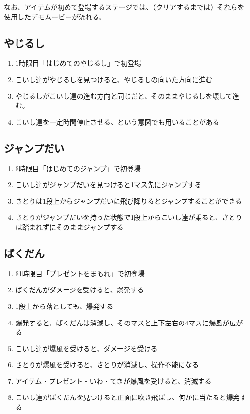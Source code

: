 なお、アイテムが初めて登場するステージでは、（クリアするまでは）それらを使用したデモムービーが流れる。


\subsection{やじるし}
\begin{enumerate}[label={\sarrow}]
\item 1時限目「はじめてのやじるし」で初登場
\item こいし達がやじるしを見つけると、やじるしの向いた方向に進む
\item やじるしがこいし達の進む方向と同じだと、そのままやじるしを壊して進む。
\item こいし達を一定時間停止させる、という意図でも用いることがある
\end{enumerate}


\subsection{ジャンプだい}
\begin{enumerate}[label={\sarrow}]
\item 8時限目「はじめてのジャンプ」で初登場
\item こいし達がジャンプだいを見つけると1マス先にジャンプする
\item さとりは1段上からジャンプだいに飛び降りるとジャンプすることができる
\item さとりがジャンプだいを持った状態で1段上からこいし達が乗ると、さとりは踏まれずにそのままジャンプする
\end{enumerate}


\subsection{ばくだん}
\begin{enumerate}[label={\sarrow}]
\item 81時限目「プレゼントをまもれ」で初登場
\item ばくだんがダメージを受けると、爆発する
\item 1段上から落としても、爆発する
\item 爆発すると、ばくだんは消滅し、そのマスと上下左右の4マスに爆風が広がる
\item こいし達が爆風を受けると、ダメージを受ける
\item さとりが爆風を受けると、さとりが消滅し、操作不能になる
\item アイテム・プレゼント・いわ・てきが爆風を受けると、消滅する
\item こいし達がばくだんを見つけると正面に吹き飛ばし、何かに当たると爆発する
\end{enumerate}


